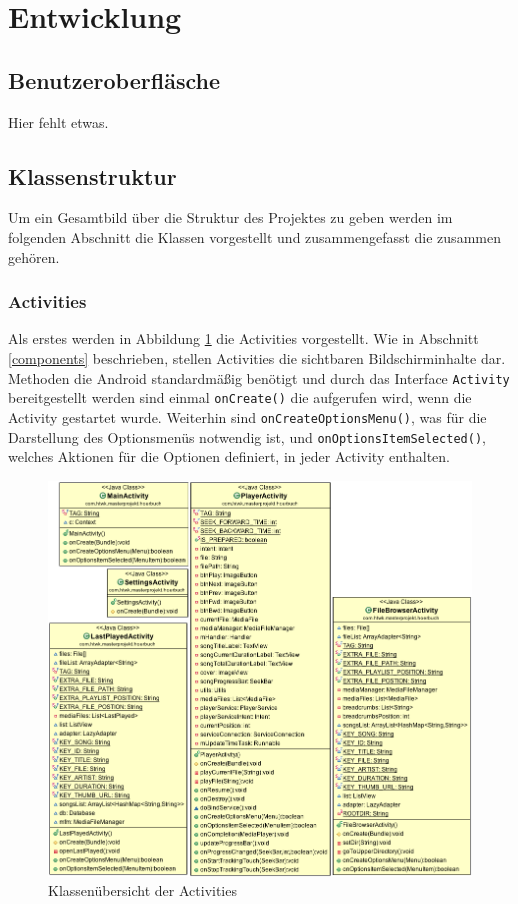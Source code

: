 \section{Entwicklung}
\subsection{Benutzeroberfläsche}
Hier fehlt etwas.

\subsection{Klassenstruktur}

Um ein Gesamtbild über die Struktur des Projektes zu geben werden im folgenden Abschnitt die Klassen vorgestellt und zusammengefasst die zusammen gehören.

\subsubsection{Activities}
Als erstes werden in Abbildung \ref{cd_activities} die Activities vorgestellt. Wie in Abschnitt \ref{components} beschrieben, stellen Activities die sichtbaren Bildschirminhalte dar. Methoden die Android standardmäßig benötigt und durch das Interface \verb+Activity+ bereitgestellt werden sind einmal \verb+onCreate()+ die aufgerufen wird, wenn die Activity gestartet wurde. Weiterhin sind \verb+onCreateOptionsMenu()+, was für die Darstellung des Optionsmenüs notwendig ist, und \verb+onOptionsItemSelected()+, welches Aktionen für die Optionen definiert, in jeder Activity enthalten.

\begin{figure}[ht!]
\begin{center}
\includegraphics[scale=.5]{images/diagram}
\caption{Klassenübersicht der Activities}
\label{cd_activities}
\end{center}
\end{figure}

